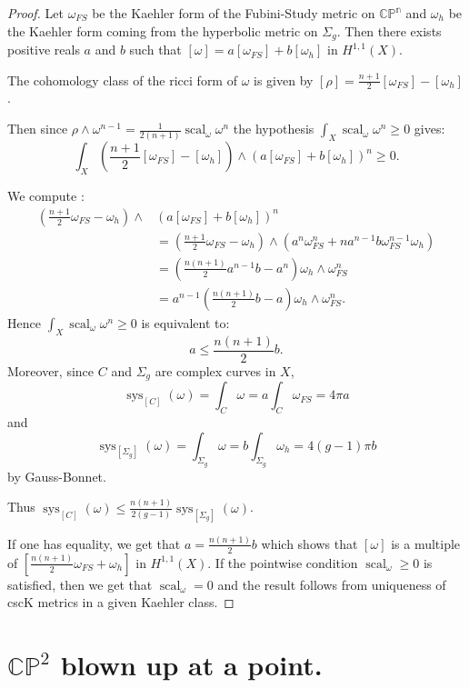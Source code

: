 \documentclass{amsart}
\numberwithin{equation}{section}
\theoremstyle {definition}
\DeclareMathOperator{\scal}{scal}
\DeclareMathOperator{\sys}{sys}
\begin{document}
\begin{proof}
    Let $\omega_{FS}$ be the Kaehler form of the Fubini-Study metric on $\mathbb{CP^n}$ and $\omega_h$ be the Kaehler form coming from the hyperbolic metric on $\Sigma_g$.
    Then there exists positive reals $a$ and $b$ such that $[\omega]=a[\omega_{FS}]+b[\omega_h]$ in $H^{1,1}(X)$.

    The cohomology class of the ricci form of $\omega$ is given by
    $[\rho]=\frac{n+1}{2}[\omega_{FS}]-[\omega_h]$.

    Then since $\rho\wedge\omega^{n-1}=\frac{1}{2(n+1)}\scal_\omega\omega^n$ the hypothesis $\int_X\scal_\omega\omega^n\geq 0$ gives:
    \[\int_X \left (\frac{n+1}{2}[\omega_{FS}]-[\omega_h]\right)\wedge \left(a[\omega_{FS}]+b[\omega_h]\right)^n\geq 0.\]

    We compute :
    \begin{align*}
        \left (\frac{n+1}{2}\omega_{FS}-\omega_h\right)\wedge & \left(a[\omega_{FS}]+b[\omega_h]\right)^n\\
        &=\left(\frac{n+1}{2}\omega_{FS}-\omega_h\right)\wedge(a^n\omega_{FS}^n+na^{n-1}b\omega_{FS}^{n-1}\omega_h)\\
        &=\left(\frac{n(n+1)}{2}a^{n-1}b-a^n\right)\omega_h\wedge\omega_{FS}^n\\
        &=a^{n-1}\left(\frac{n(n+1)}{2}b-a\right)\omega_h\wedge\omega_{FS}^n.
    \end{align*}
    Hence $\int_X\scal_{\omega}\omega^n\geq 0$ is equivalent to:
    \[a\leq\frac{n(n+1)}{2}b.\]
    Moreover, since $C$ and $\Sigma_g$ are complex curves in $X$, \[\sys_{[C]}(\omega)=\int_C\omega=a\int_C\omega_{FS}=4\pi a\]
    and
    \[\sys_{[\Sigma_g]}(\omega)=\int_{\Sigma_g}\omega=b\int_{\Sigma_g}\omega_{h}=4(g-1)\pi b\] by Gauss-Bonnet.

    Thus $\sys_{[C]}(\omega)\leq\frac{n(n+1)}{2(g-1)}\sys_{[\Sigma_g]}(\omega)$.

    If one has equality, we get that $a=\frac{n(n+1)}{2}b$ which shows that $[\omega]$ is a multiple of $[\frac{n(n+1)}{2}\omega_{FS}+\omega_h]$ in $H^{1,1}(X)$. If the pointwise condition $\scal_\omega\geq 0$ is satisfied, then we get that $\scal_\omega=0$ and the result follows from uniqueness of cscK metrics in a given Kaehler class.
\end{proof}

\section{$\mathbb{CP}^2$ blown up at a point.}
\end{document}
